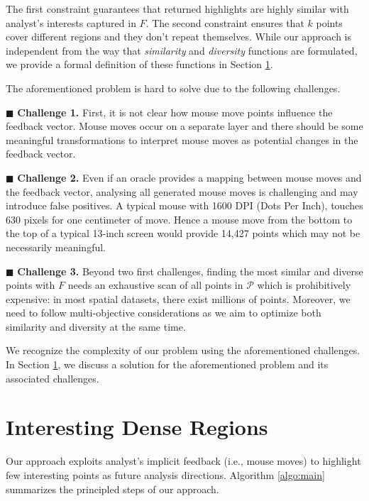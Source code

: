 \documentclass[sigconf,edbt]{acmart-edbt2019}
\begin{document}
\vspace{3pt}
The first constraint guarantees that returned highlights are highly similar with analyst's interests captured in $F$. The second constraint ensures that $k$ points cover different regions and they don't repeat themselves. While our approach is independent from the way that {\em similarity} and {\em diversity} functions are formulated, we provide a formal definition of these functions in Section \ref{sec:algo}.

\vspace{2pt}
The aforementioned problem is hard to solve due to the following challenges.

\vspace{3pt}
\noindent $\blacksquare$ {\bf Challenge 1.} First, it is not clear how mouse move points influence the feedback vector. Mouse moves occur on a separate layer and there should be some meaningful transformations to interpret mouse moves as potential changes in the feedback vector. 

\vspace{2pt}
\noindent $\blacksquare$ {\bf Challenge 2.} Even if an oracle provides a mapping between mouse moves and the feedback vector, analysing all generated mouse moves is challenging and may introduce false positives. A typical mouse with 1600 DPI (Dots Per Inch), touches 630 pixels for one centimeter of move. Hence a mouse move from the bottom to the top of a typical 13-inch screen would provide 14,427 points which may not be necessarily meaningful.

\vspace{3pt}
\noindent $\blacksquare$ {\bf Challenge 3.} Beyond two first challenges, finding the most similar and diverse points with $F$ needs an exhaustive scan of all points in $\mathcal{P}$ which is prohibitively expensive: in most spatial datasets, there exist millions of points. Moreover, we need to follow multi-objective considerations as we aim to optimize both similarity and diversity at the same time.

\vspace{2pt}
We recognize the complexity of our problem using the aforementioned challenges. In Section \ref{sec:algo}, we discuss a solution for the aforementioned problem and its associated challenges.

\section{Interesting Dense Regions}
\label{sec:algo}
Our approach exploits analyst's implicit feedback (i.e., mouse moves) to highlight few interesting points as future analysis directions. Algorithm \ref{algo:main} summarizes the principled steps of our approach.
\end{document}
